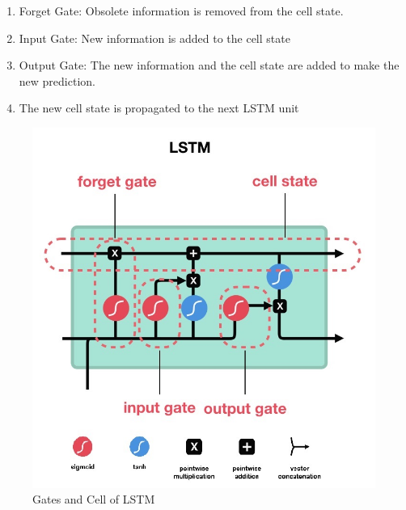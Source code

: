 \begin{enumerate}
	\item Forget Gate: Obsolete information is removed from the cell state.
	\item Input Gate: New information is added to the cell state
	\item Output Gate: The new information and the cell state are added to make the new prediction.
	\item The new cell state is propagated to the next LSTM unit  
\end{enumerate}
     
\begin{figure}[h]
	\centering
	\includegraphics[scale=0.5]{Figures/LSTM}
	\decoRule
	\caption[Gates and Cell of LSTM]{Gates and Cell of LSTM  \parencite{MichaelPhi2018}}
	\label{fig:LSTM}
\end{figure}



